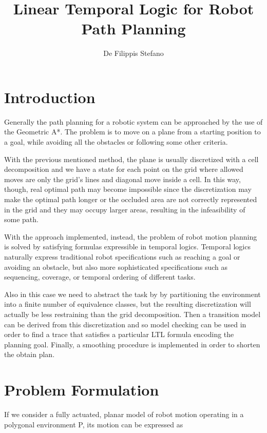 \documentclass[conference,12pt]{IEEEtran}
\begin{document}
\title{\textbf{Linear Temporal Logic for Robot Path Planning}}
\author{De Filippis Stefano}

\maketitle

\section*{Introduction}

Generally the path planning for a robotic system can be approached by the use of the Geometric A*. The problem is to move on a plane from a starting position to a goal, while avoiding all the obstacles or following some other criteria. 

With the previous mentioned method, the plane is usually discretized with a cell decomposition and we have a state for each point on the grid where allowed moves are only the grid’s lines and diagonal move inside a cell. In this way, though, real optimal path may become impossible since the discretization may make the optimal path longer or the occluded area are not correctly represented in the grid and they may occupy larger areas, resulting in the infeasibility of some path.

With the approach implemented, instead, the problem of robot motion planning is solved by satisfying formulas expressible in temporal logics. Temporal logics naturally express traditional robot specifications such as reaching a goal or avoiding an obstacle, but also more sophisticated specifications such as sequencing, coverage, or temporal ordering of different tasks. 

Also in this case we need to abstract the task by by partitioning the environment into a finite number of equivalence classes, but the resulting discretization will actually be less restraining than the grid decomposition. Then a transition model can be derived from this discretization and so model checking can be used in order to find a trace that satisfies a particular LTL formula encoding the planning goal. Finally, a smoothing procedure is implemented in order to shorten the obtain plan.

\section{Problem Formulation}

If we consider a fully actuated, planar model of robot motion operating in a polygonal environment P, its motion can be expressed as
\end{document}
